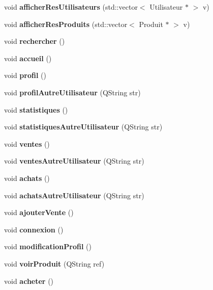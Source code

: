 \begin{DoxyCompactItemize}
\item 
void {\bfseries afficher\-Res\-Utilisateurs} (std\-::vector$<$ Utilisateur $\ast$ $>$ v)\label{class_ma_fenetre_a4c4a8f4b2f7a79839e2c2250f4835166}

\item 
void {\bfseries afficher\-Res\-Produits} (std\-::vector$<$ Produit $\ast$ $>$ v)\label{class_ma_fenetre_a115348adbe409a24a0d381e1fcc62fe7}

\item 
void {\bfseries rechercher} ()\label{class_ma_fenetre_a8107c2666807db431962fdcd4e942c69}

\item 
void {\bfseries accueil} ()\label{class_ma_fenetre_abc0a097122f161ced271718b254206cd}

\item 
void {\bfseries profil} ()\label{class_ma_fenetre_a08a81ac61e783cf5ed3855ca4f18c84e}

\item 
void {\bfseries profil\-Autre\-Utilisateur} (Q\-String str)\label{class_ma_fenetre_a91caf819bc0ddee1c27a35b131049259}

\item 
void {\bfseries statistiques} ()\label{class_ma_fenetre_abdebcc3a608ba960f92d9c33198afa8e}

\item 
void {\bfseries statistiques\-Autre\-Utilisateur} (Q\-String str)\label{class_ma_fenetre_a001780a069e034521e7669382d7eb5e1}

\item 
void {\bfseries ventes} ()\label{class_ma_fenetre_ae0699859505bac920f9cb033ddb1da23}

\item 
void {\bfseries ventes\-Autre\-Utilisateur} (Q\-String str)\label{class_ma_fenetre_acf4ee6e1091a054e5401c9b9b00fcb41}

\item 
void {\bfseries achats} ()\label{class_ma_fenetre_a48f619e7d913b0e969273be7435b9ab5}

\item 
void {\bfseries achats\-Autre\-Utilisateur} (Q\-String str)\label{class_ma_fenetre_ac384e90a833894bec8d4552659e90c31}

\item 
void {\bfseries ajouter\-Vente} ()\label{class_ma_fenetre_abd8cb1d6b536873f3d369457073270c4}

\item 
void {\bfseries connexion} ()\label{class_ma_fenetre_a65270bfc0eeecb1003c6abc9a1199f32}

\item 
void {\bfseries modification\-Profil} ()\label{class_ma_fenetre_a4568c5e0376f04b9d1ab6c54b9f7c7ed}

\item 
void {\bfseries voir\-Produit} (Q\-String ref)\label{class_ma_fenetre_ade3a46e2b308936d934503a88275495a}

\item 
void {\bfseries acheter} ()\label{class_ma_fenetre_a44eae809341ad4816d8ca151d9b703fb}

\end{DoxyCompactItemize}
